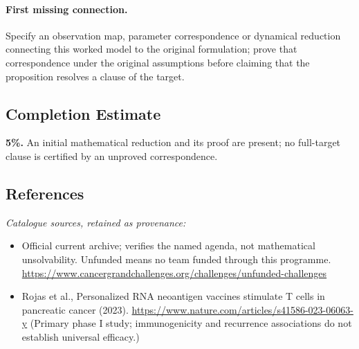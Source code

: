 \documentclass[11pt]{article}
\begin{document}
\paragraph{First missing connection.} Specify an observation map, parameter correspondence or dynamical reduction connecting this worked model to the original formulation; prove that correspondence under the original assumptions before claiming that the proposition resolves a clause of the target.
\subsection{Completion Estimate}
\textbf{5\%.} An initial mathematical reduction and its proof are present; no full-target clause is certified by an unproved correspondence.
\subsection{References}
\noindent\emph{Catalogue sources, retained as provenance:}
\begin{itemize}
\item Official current archive; verifies the named agenda, not mathematical unsolvability. Unfunded means no team funded through this programme. \url{https://www.cancergrandchallenges.org/challenges/unfunded-challenges}
\item Rojas et al., Personalized RNA neoantigen vaccines stimulate T cells in pancreatic cancer (2023). \url{https://www.nature.com/articles/s41586-023-06063-y} (Primary phase I study; immunogenicity and recurrence associations do not establish universal efficacy.)
\end{itemize}
\end{document}
